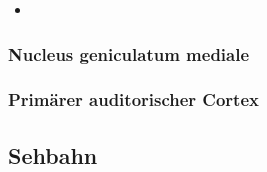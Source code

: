 \documentclass[12pt,a4paper,pdftex]{article}
\begin{document}
    \begin{itemize}
        \item 
    \end{itemize}

\subsubsection*{Nucleus geniculatum mediale}

\subsubsection*{Primärer auditorischer Cortex}

\newpage
\subsection{Sehbahn}
\end{document}
